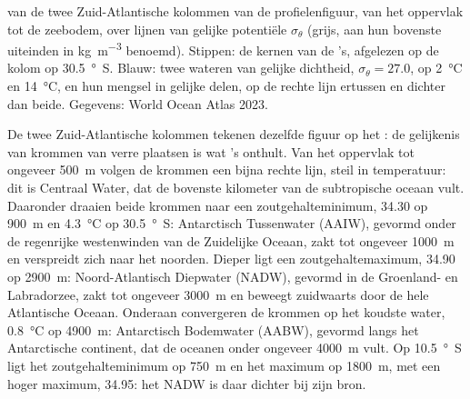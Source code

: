 \begin{omfigure}
{\small {} van de twee Zuid-Atlantische kolommen van de profielenfiguur, van het oppervlak tot de zeebodem, over lijnen van gelijke potentiële  $\sigma_\theta$ (grijs, aan hun bovenste uiteinden in \si{kg.m^{-3}} benoemd). Stippen: de kernen van de 's, afgelezen op de kolom op \qty{30.5}{\degree S}. Blauw: twee wateren van gelijke dichtheid, $\sigma_\theta = 27.0$, op \qty{2}{\celsius} en \qty{14}{\celsius}, en hun mengsel in gelijke delen, op de rechte lijn ertussen en dichter dan beide. Gegevens: World Ocean Atlas 2023.}
\label{fig:b1:fluid-envelopes-structure:ts}
\end{omfigure}

De twee Zuid-Atlantische kolommen tekenen dezelfde figuur op het : de gelijkenis van krommen van verre plaatsen is wat 's onthult. Van het oppervlak tot ongeveer \qty{500}{m} volgen de krommen een bijna rechte lijn, steil in temperatuur: dit is Centraal Water, dat de bovenste kilometer van de subtropische oceaan vult. Daaronder draaien beide krommen naar een zoutgehalteminimum, \num{34.30} op \qty{900}{m} en \qty{4.3}{\celsius} op \qty{30.5}{\degree S}: Antarctisch Tussenwater (AAIW), gevormd onder de regenrijke westenwinden van de Zuidelijke Oceaan, zakt tot ongeveer \qty{1000}{m} en verspreidt zich naar het noorden. Dieper ligt een zoutgehaltemaximum, \num{34.90} op \qty{2900}{m}: Noord-Atlantisch Diepwater (NADW), gevormd in de Groenland- en Labradorzee, zakt tot ongeveer \qty{3000}{m} en beweegt zuidwaarts door de hele Atlantische Oceaan. Onderaan convergeren de krommen op het koudste water, \qty{0.8}{\celsius} op \qty{4900}{m}: Antarctisch Bodemwater (AABW), gevormd langs het Antarctische continent, dat de oceanen onder ongeveer \qty{4000}{m} vult. Op \qty{10.5}{\degree S} ligt het zoutgehalteminimum op \qty{750}{m} en het maximum op \qty{1800}{m}, met een hoger maximum, \num{34.95}: het NADW is daar dichter bij zijn bron.

